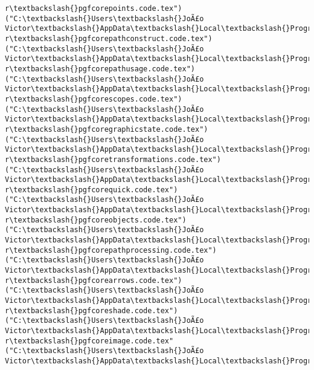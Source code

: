 \documentclass[11pt]{article}
\begin{document}
\begin{Verbatim}[commandchars=\\\{\}]
r\textbackslash{}pgfcorepoints.code.tex")
("C:\textbackslash{}Users\textbackslash{}JoÃ£o Victor\textbackslash{}AppData\textbackslash{}Local\textbackslash{}Programs\textbackslash{}MiKTeX\textbackslash{}tex/generic/pgf/basiclaye
r\textbackslash{}pgfcorepathconstruct.code.tex")
("C:\textbackslash{}Users\textbackslash{}JoÃ£o Victor\textbackslash{}AppData\textbackslash{}Local\textbackslash{}Programs\textbackslash{}MiKTeX\textbackslash{}tex/generic/pgf/basiclaye
r\textbackslash{}pgfcorepathusage.code.tex")
("C:\textbackslash{}Users\textbackslash{}JoÃ£o Victor\textbackslash{}AppData\textbackslash{}Local\textbackslash{}Programs\textbackslash{}MiKTeX\textbackslash{}tex/generic/pgf/basiclaye
r\textbackslash{}pgfcorescopes.code.tex")
("C:\textbackslash{}Users\textbackslash{}JoÃ£o Victor\textbackslash{}AppData\textbackslash{}Local\textbackslash{}Programs\textbackslash{}MiKTeX\textbackslash{}tex/generic/pgf/basiclaye
r\textbackslash{}pgfcoregraphicstate.code.tex")
("C:\textbackslash{}Users\textbackslash{}JoÃ£o Victor\textbackslash{}AppData\textbackslash{}Local\textbackslash{}Programs\textbackslash{}MiKTeX\textbackslash{}tex/generic/pgf/basiclaye
r\textbackslash{}pgfcoretransformations.code.tex")
("C:\textbackslash{}Users\textbackslash{}JoÃ£o Victor\textbackslash{}AppData\textbackslash{}Local\textbackslash{}Programs\textbackslash{}MiKTeX\textbackslash{}tex/generic/pgf/basiclaye
r\textbackslash{}pgfcorequick.code.tex")
("C:\textbackslash{}Users\textbackslash{}JoÃ£o Victor\textbackslash{}AppData\textbackslash{}Local\textbackslash{}Programs\textbackslash{}MiKTeX\textbackslash{}tex/generic/pgf/basiclaye
r\textbackslash{}pgfcoreobjects.code.tex")
("C:\textbackslash{}Users\textbackslash{}JoÃ£o Victor\textbackslash{}AppData\textbackslash{}Local\textbackslash{}Programs\textbackslash{}MiKTeX\textbackslash{}tex/generic/pgf/basiclaye
r\textbackslash{}pgfcorepathprocessing.code.tex")
("C:\textbackslash{}Users\textbackslash{}JoÃ£o Victor\textbackslash{}AppData\textbackslash{}Local\textbackslash{}Programs\textbackslash{}MiKTeX\textbackslash{}tex/generic/pgf/basiclaye
r\textbackslash{}pgfcorearrows.code.tex")
("C:\textbackslash{}Users\textbackslash{}JoÃ£o Victor\textbackslash{}AppData\textbackslash{}Local\textbackslash{}Programs\textbackslash{}MiKTeX\textbackslash{}tex/generic/pgf/basiclaye
r\textbackslash{}pgfcoreshade.code.tex")
("C:\textbackslash{}Users\textbackslash{}JoÃ£o Victor\textbackslash{}AppData\textbackslash{}Local\textbackslash{}Programs\textbackslash{}MiKTeX\textbackslash{}tex/generic/pgf/basiclaye
r\textbackslash{}pgfcoreimage.code.tex"
("C:\textbackslash{}Users\textbackslash{}JoÃ£o Victor\textbackslash{}AppData\textbackslash{}Local\textbackslash{}Programs\textbackslash{}MiKTeX\textbackslash{}tex/generic/pgf/basiclaye

\end{Verbatim}
\end{document}
